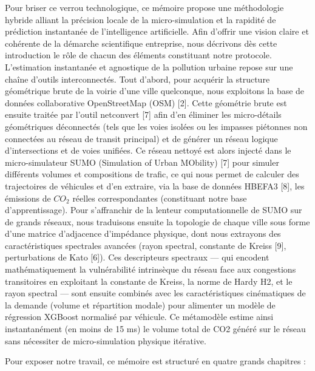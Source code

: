 \documentclass[10pt, a4paper]{article}
\begin{document}
Pour briser ce verrou technologique, ce mémoire propose une méthodologie
hybride alliant la précision locale de la micro-simulation et la
rapidité de prédiction instantanée de l'intelligence artificielle. Afin
d'offrir une vision claire et cohérente de la démarche scientifique
entreprise, nous décrivons dès cette introduction le rôle de chacun des
éléments constituant notre protocole. L'estimation instantanée et
agnostique de la pollution urbaine repose sur une chaîne d'outils
interconnectés. Tout d'abord, pour acquérir la structure géométrique
brute de la voirie d'une ville quelconque, nous exploitons la base de
données collaborative OpenStreetMap (OSM) {[}2{]}. Cette géométrie brute
est ensuite traitée par l'outil netconvert {[}7{]} afin d'en éliminer
les micro-détails géométriques déconnectés (tels que les voies isolées
ou les impasses piétonnes non connectées au réseau de transit principal)
et de générer un réseau logique d'intersections et de voies unifiées. Ce
réseau nettoyé est alors injecté dans le micro-simulateur SUMO
(Simulation of Urban MObility) {[}7{]} pour simuler différents volumes
et compositions de trafic, ce qui nous permet de calculer des
trajectoires de véhicules et d'en extraire, via la base de données
HBEFA3 {[}8{]}, les émissions de \(CO_2\) réelles correspondantes
(constituant notre base d'apprentissage). Pour s'affranchir de la
lenteur computationnelle de SUMO sur de grands réseaux, nous traduisons
ensuite la topologie de chaque ville sous forme d'une matrice
d'adjacence d'impédance physique, dont nous extrayons des
caractéristiques spectrales avancées (rayon spectral, constante de
Kreiss {[}9{]}, perturbations de Kato {[}6{]}). Ces descripteurs
spectraux --- qui encodent mathématiquement la vulnérabilité intrinsèque
du réseau face aux congestions transitoires en exploitant la constante
de Kreiss, la norme de Hardy H2, et le rayon spectral --- sont ensuite
combinés avec les caractéristiques cinématiques de la demande (volume et
répartition modale) pour alimenter un modèle de régression XGBoost
normalisé par véhicule. Ce métamodèle estime ainsi instantanément (en
moins de 15 ms) le volume total de CO2 généré sur le réseau sans
nécessiter de micro-simulation physique itérative.

Pour exposer notre travail, ce mémoire est structuré en quatre grands
chapitres :
\end{document}
